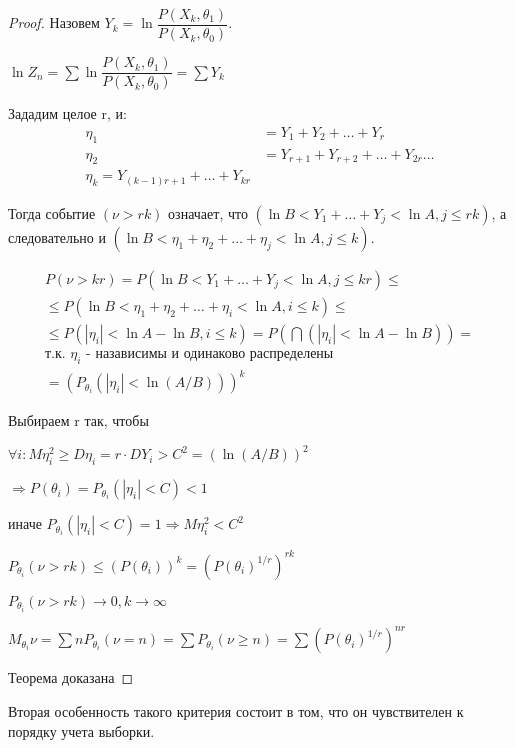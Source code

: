 \begin{proof}
  Назовем $Y_k = \ln \dfrac{P(X_k, \theta_1)}{P(X_k, \theta_0)}$.

  $\ln Z_n = \sum \ln \dfrac{P(X_k, \theta_1)}{P(X_k, \theta_0)} = \sum Y_k$

  Зададим целое r, и:
  \begin{align*}
    \eta_1 &= Y_1 + Y_2 + \dots + Y_r \\
    \eta_2 &= Y_{r+1} + Y_{r+2} + \dots + Y_{2r}
    \dots \\
    \eta_k = Y_{(k-1) r + 1} + \dots + Y_{kr}
  \end{align*}

  Тогда событие $(\nu > rk)$ означает, что $(\ln B < Y_1 + \dots + Y_j < \ln A, j \leqslant rk)$, а следовательно и $(\ln B < \eta_1 + \eta_2 + \dots + \eta_j < \ln A, j \leqslant k)$.

  \begin{multline*}
    P(\nu > kr) = P(\ln B < Y_1 + \dots + Y_j < \ln A, j \leqslant kr) \leqslant \\
    \leqslant P(\ln B < \eta_1 + \eta_2 + \dots + \eta_i < \ln A, i \leqslant k) \leqslant \\
    \leqslant P(|\eta_i| < \ln A - \ln B, i \leqslant k)
    = P(\bigcap (|\eta_i| < \ln A - \ln B)) = \\
    \text{т.к. $\eta_i$ - назависимы и одинаково распределены} \\
    = (P_{\theta_i} (|\eta_i| < \ln (A/B)))^k
  \end{multline*}


  Выбираем r так, чтобы
  
  $\forall i : M \eta_i^2 \geqslant D \eta_i = r \cdot D Y_i > C^2 = (\ln (A/B))^2$
  
  $\Rightarrow P(\theta_i) = P_{\theta_i} (|\eta_i| < C) < 1$

  иначе $P_{\theta_i} (|\eta_i| < C) = 1 \Rightarrow M \eta_i^2 < C^2$

  $P_{\theta_i} (\nu > rk) \leqslant (P(\theta_i))^k = (P(\theta_i)^{1/r})^{rk}$

  $P_{\theta_i} (\nu > rk) \to 0, k \to \infty$

  $M_{\theta_i} \nu = \sum n P_{\theta_i} (\nu  = n) = \sum P_{\theta_i} (\nu \geqslant n) = \sum ( P(\theta_i)^{1/r} )^{nr}$

  Теорема доказана
\end{proof}

Вторая особенность такого критерия состоит в том, что он чувствителен к порядку учета выборки.


